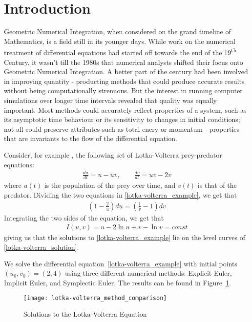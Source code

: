 \documentclass[../Main.tex]{subfiles}
\begin{document}
\section{Introduction}

Geometric Numerical Integration, when considered on the grand timeline of Mathematics, is a field still in its younger days. While work on the numerical treatment of differential equations had started off towards the end of the 19\textsuperscript{th} Century, it wasn't till the 1980s that numerical analysts shifted their focus onto Geometric Numerical Integration.  A  better part of the century had been involved in improving quantity -  producting methods that could produce accurate results without being computationally strenuous. But the interest in running computer simulations over longer time intervals revealed that quality was equally important. Most methods could accurately reflect properties of a system, such as its asymptotic time behaviour or its sensitivity to changes in initial conditions; not all could preserve attributes such as total enery or momentum - properties that are invariants to the flow of the differential equation.

Consider, for example \cite{Hairer2006}, the following set of Lotka-Volterra prey-predator equations:
\begin{align}
	\frac{du}{dt} = u - uv, \qquad \frac{dv}{dt} = uv - 2v \label{lotka-volterra_example}
\end{align} where $u(t)$ is the population of the prey over time, and $v(t)$ is that of the predator. Dividing the two equations in \ref{lotka-volterra_example}, we get that
\begin{align*}
\left(1 -  \frac{2}{u}\right) du = \left(\frac{1}{v} - 1\right) dv
\end{align*}
Integrating the two sides of the equation, we get that
\begin{align}
I(u, v) = u - 2\ln{u} +  v - \ln{v} = const \label{lotka-volterra_solution}
\end{align}
giving us that the solutions to \ref{lotka-volterra_example} lie on the level curves of \ref{lotka-volterra_solution}.

We solve the differential equation~\ref{lotka-volterra_example} with initial points $(u_0, v_0) = (2, 4)$ using three different numerical methods: Explicit Euler, Implicit Euler, and Symplectic Euler. The results can be found in Figure~\ref{fig:lotka-volterra_solutions}. 
\begin{figure}[H]
\texttt{[image: lotka-volterra\_method\_comparison]}
\centering
\caption{Solutions to the Lotka-Volterra Equation}
\label{fig:lotka-volterra_solutions}
\end{figure}
\end{document}
